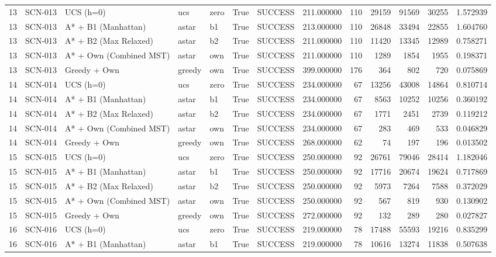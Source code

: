 \begin{table}[htbp]
\begin{tabular}{rllllrlrrrrrr}
13 & SCN-013 & UCS (h=0) & ucs & zero & True & SUCCESS & 211.000000 & 110 & 29159 & 91569 & 30255 & 1.572939 \\
13 & SCN-013 & A* + B1 (Manhattan) & astar & b1 & True & SUCCESS & 213.000000 & 110 & 26848 & 33494 & 22855 & 1.604760 \\
13 & SCN-013 & A* + B2 (Max Relaxed) & astar & b2 & True & SUCCESS & 211.000000 & 110 & 11420 & 13345 & 12989 & 0.758271 \\
13 & SCN-013 & A* + Own (Combined MST) & astar & own & True & SUCCESS & 211.000000 & 110 & 1289 & 1854 & 1955 & 0.198371 \\
13 & SCN-013 & Greedy + Own & greedy & own & True & SUCCESS & 399.000000 & 176 & 364 & 802 & 720 & 0.075869 \\
14 & SCN-014 & UCS (h=0) & ucs & zero & True & SUCCESS & 234.000000 & 67 & 13256 & 43008 & 14864 & 0.810714 \\
14 & SCN-014 & A* + B1 (Manhattan) & astar & b1 & True & SUCCESS & 234.000000 & 67 & 8563 & 10252 & 10256 & 0.360192 \\
14 & SCN-014 & A* + B2 (Max Relaxed) & astar & b2 & True & SUCCESS & 234.000000 & 67 & 1771 & 2451 & 2739 & 0.119212 \\
14 & SCN-014 & A* + Own (Combined MST) & astar & own & True & SUCCESS & 234.000000 & 67 & 283 & 469 & 533 & 0.046829 \\
14 & SCN-014 & Greedy + Own & greedy & own & True & SUCCESS & 268.000000 & 62 & 74 & 197 & 196 & 0.013502 \\
15 & SCN-015 & UCS (h=0) & ucs & zero & True & SUCCESS & 250.000000 & 92 & 26761 & 79046 & 28414 & 1.182046 \\
15 & SCN-015 & A* + B1 (Manhattan) & astar & b1 & True & SUCCESS & 250.000000 & 92 & 17716 & 20674 & 19624 & 0.717869 \\
15 & SCN-015 & A* + B2 (Max Relaxed) & astar & b2 & True & SUCCESS & 250.000000 & 92 & 5973 & 7264 & 7588 & 0.372029 \\
15 & SCN-015 & A* + Own (Combined MST) & astar & own & True & SUCCESS & 250.000000 & 92 & 567 & 819 & 930 & 0.130902 \\
15 & SCN-015 & Greedy + Own & greedy & own & True & SUCCESS & 272.000000 & 92 & 132 & 289 & 280 & 0.027827 \\
16 & SCN-016 & UCS (h=0) & ucs & zero & True & SUCCESS & 219.000000 & 78 & 17488 & 55593 & 19216 & 0.835299 \\
16 & SCN-016 & A* + B1 (Manhattan) & astar & b1 & True & SUCCESS & 219.000000 & 78 & 10616 & 13274 & 11838 & 0.507638 \\

\end{tabular}
\end{table}
